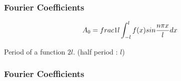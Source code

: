 \documentclass{beamer}
\begin{document}
\begin{frame}
\frametitle{Fourier Coefficients}

\[A_0 = \\frac{1}{l} \int_{-l}^{l}f(x) sin \frac{n\pi x}{l} dx \]


Period of a function $2l$. (half period : $l$)
\end{frame}
\begin{frame}
\frametitle{Fourier Coefficients}

\end{frame}
\end{document}
